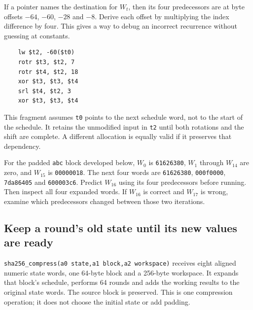 If a pointer names the destination for $W_t$, then its four predecessors are
at byte offsets $-64$, $-60$, $-28$ and $-8$. Derive each offset by multiplying
the index difference by four. This gives a way to debug an incorrect recurrence
without guessing at constants.

\begin{verbatim}
    lw $t2, -60($t0)
    rotr $t3, $t2, 7
    rotr $t4, $t2, 18
    xor $t3, $t3, $t4
    srl $t4, $t2, 3
    xor $t3, $t3, $t4
\end{verbatim}

This fragment assumes \texttt{t0} points to the next schedule word, not to the
start of the schedule. It retains the unmodified input in \texttt{t2} until
both rotations and the shift are complete. A different allocation is equally
valid if it preserves that dependency.

For the padded \texttt{abc} block developed below, $W_0$ is
\texttt{61626380}, $W_1$ through $W_{14}$ are zero, and $W_{15}$ is
\texttt{00000018}. The next four words are \texttt{61626380},
\texttt{000f0000}, \texttt{7da86405} and \texttt{600003c6}.
Predict $W_{16}$ using its four predecessors before running. Then inspect all
four expanded words. If $W_{16}$ is correct and $W_{17}$ is wrong, examine which
predecessors changed between those two iterations.



\subsection*{Keep a round's old state until its new values are ready}

\texttt{sha256\_compress(a0 state,a1 block,a2 workspace)} receives eight
aligned numeric state words, one 64-byte block and a 256-byte workspace.
It expands that block's schedule, performs 64 rounds and adds the working
results to the original state words. The source block is preserved. This is one
compression operation; it does not choose the initial state or add padding.

